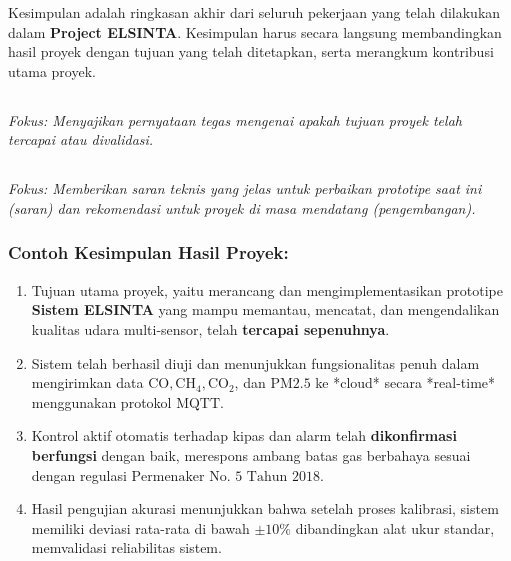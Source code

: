 \documentclass{elsinta}
\begin{document}
Kesimpulan adalah ringkasan akhir dari seluruh pekerjaan yang telah dilakukan dalam \textbf{Project ELSINTA}. Kesimpulan harus secara langsung membandingkan hasil proyek dengan tujuan yang telah ditetapkan, serta merangkum kontribusi utama proyek.




\subsection{\ProjectSummaryTitle}

\textit{Fokus: Menyajikan pernyataan tegas mengenai apakah tujuan proyek telah tercapai atau divalidasi.}

\subsection{\SuggestionTitle}

\textit{Fokus: Memberikan saran teknis yang jelas untuk perbaikan prototipe saat ini (saran) dan rekomendasi untuk proyek di masa mendatang (pengembangan).}

\subsubsection*{Contoh Kesimpulan Hasil Proyek:}
\begin{enumerate}
    \item Tujuan utama proyek, yaitu merancang dan mengimplementasikan prototipe \textbf{Sistem ELSINTA} yang mampu memantau, mencatat, dan mengendalikan kualitas udara multi-sensor, telah \textbf{tercapai sepenuhnya}.
    \item Sistem telah berhasil diuji dan menunjukkan fungsionalitas penuh dalam mengirimkan data $\text{CO}, \text{CH}_4, \text{CO}_2$, dan $\text{PM2.5}$ ke *cloud* secara *real-time* menggunakan protokol $\text{MQTT}$.
    \item Kontrol aktif otomatis terhadap kipas dan alarm telah \textbf{dikonfirmasi berfungsi} dengan baik, merespons ambang batas gas berbahaya sesuai dengan regulasi $\text{Permenaker No. 5 Tahun 2018}$.
    \item Hasil pengujian akurasi menunjukkan bahwa setelah proses kalibrasi, sistem memiliki deviasi rata-rata di bawah $\pm 10\%$ dibandingkan alat ukur standar, memvalidasi reliabilitas sistem.
\end{enumerate}
\end{document}
